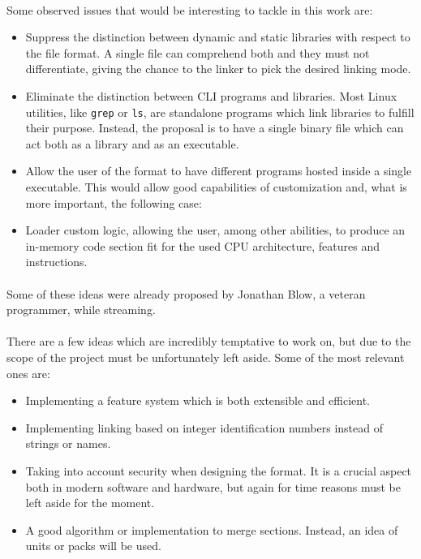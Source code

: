 \documentclass[12pt]{article}
\begin{document}
	\paragraph{}Some observed issues that would be interesting to tackle in this work are:
	\begin{itemize}
		\item Suppress the distinction between dynamic and static libraries with respect to the file format. A single file can comprehend both and they must not differentiate, giving the chance to the linker to pick the desired linking mode.
		\item Eliminate the distinction between \acrshort{CLI} programs and libraries. Most Linux utilities, like \verb|grep| or \verb|ls|, are standalone programs which link libraries to fulfill their purpose. Instead, the proposal is to have a single binary file which can act both as a library and as an executable.
		\item Allow the user of the format to have different programs hosted inside a single executable. This would allow good capabilities of customization and, what is more important, the following case:
		\item Loader custom logic, allowing the user, among other abilities, to produce an in-memory code section fit for the used CPU architecture, features and instructions.
	\end{itemize}
	\paragraph{}Some of these ideas were already proposed by Jonathan Blow, a veteran programmer, while streaming\cite{jblow}.
	\paragraph{}There are a few ideas which are incredibly temptative to work on, but due to the scope of the project must be unfortunately left aside. Some of the most relevant ones are:
	\begin{itemize}
		\item Implementing a feature system which is both extensible and efficient.
		\item Implementing linking based on integer identification numbers instead of strings or names.
		\item Taking into account security when designing the format. It is a crucial aspect both in modern software and hardware, but again for time reasons must be left aside for the moment.
		\item A good algorithm or implementation to merge sections. Instead, an idea of units or packs will be used.
	\end{itemize}
\end{document}
